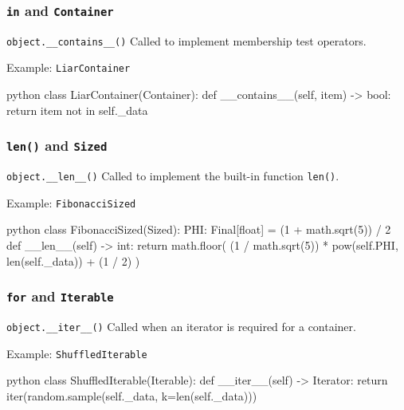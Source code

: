 \documentclass[aspectratio=169,dvipdfmx,12pt,notheorems]{beamer}
\theoremstyle{definition}
\begin{document}
\begin{frame}[fragile]\frametitle{\texttt{in} and \texttt{Container}}

\begin{block}{\texttt{object.\_\_contains\_\_()}}
Called to implement membership test operators.
\end{block}

\begin{exampleblock}{Example: \texttt{LiarContainer}}
\begin{pygments}{python}
class LiarContainer(Container):
    def __contains__(self, item) -> bool:
        return item not in self._data
\end{pygments}
\end{exampleblock}

\end{frame}

\begin{frame}[fragile]\frametitle{\texttt{len()} and \texttt{Sized}}

\begin{block}{\texttt{object.\_\_len\_\_()}}
Called to implement the built-in function \texttt{len()}.
\end{block}

\begin{exampleblock}{Example: \texttt{FibonacciSized}}
\begin{pygments}{python}
class FibonacciSized(Sized):
    PHI: Final[float] = (1 + math.sqrt(5)) / 2
    def __len__(self) -> int:
        return math.floor(
            (1 / math.sqrt(5)) * pow(self.PHI, len(self._data))
            + (1 / 2)
        )
\end{pygments}
\end{exampleblock}

\end{frame}

\begin{frame}[fragile]\frametitle{\texttt{for} and \texttt{Iterable}}

\begin{block}{\texttt{object.\_\_iter\_\_()}}
Called when an iterator is required for a container. 
\end{block}

\begin{exampleblock}{Example: \texttt{ShuffledIterable}}
\begin{pygments}{python}
class ShuffledIterable(Iterable):
    def __iter__(self) -> Iterator:
        return iter(random.sample(self._data, k=len(self._data)))
\end{pygments}
\end{exampleblock}

\end{frame}
\end{document}
